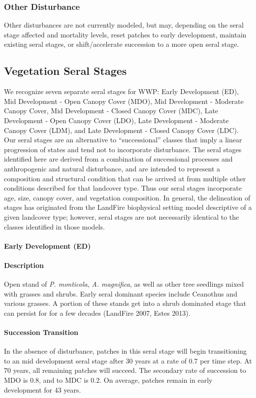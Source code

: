 \subsubsection{Other Disturbance}
Other disturbances are not currently modeled, but may, depending on the seral stage affected and mortality levels, reset patches to early development, maintain existing seral stages, or shift/accelerate succession to a more open seral stage. 

\subsection*{Vegetation Seral Stages}
We recognize seven separate seral stages for WWP: Early Development (ED), Mid Development - Open Canopy Cover (MDO), Mid Development - Moderate Canopy Cover, Mid Development - Closed Canopy Cover (MDC), Late Development - Open Canopy Cover (LDO), Late Development - Moderate Canopy Cover (LDM), and Late Development - Closed Canopy Cover (LDC). Our seral stages are an alternative to ``successional'' classes that imply a linear progression of states and tend not to incorporate disturbance. The seral stages identified here are derived from a combination of successional processes and anthropogenic and natural disturbance, and are intended to represent a composition and structural condition that can be arrived at from multiple other conditions described for that landcover type. Thus our seral stages incorporate age, size, canopy cover, and vegetation composition. In general, the delineation of stages has originated from the LandFire biophysical setting model descriptive of a given landcover type; however, seral stages are not necessarily identical to the classes identified in those models.

\paragraph{Early Development (ED)}

\paragraph{Description} Open stand of \emph{P. monticola}, \emph{A. magnifica}, as well as other tree seedlings mixed with grasses and shrubs. Early seral dominant species include Ceanothus and various grasses. A portion of these stands get into a shrub dominated stage that can persist for for a few decades (LandFire 2007, Estes 2013).

\paragraph{Succession Transition} In the absence of disturbance, patches in this seral stage will begin transitioning to an mid development seral stage after 30 years at a rate of 0.7 per time step. At 70 years, all remaining patches will succeed. The secondary rate of succession to MDO is 0.8, and to MDC is 0.2. On average, patches remain in early development for 43 years.

